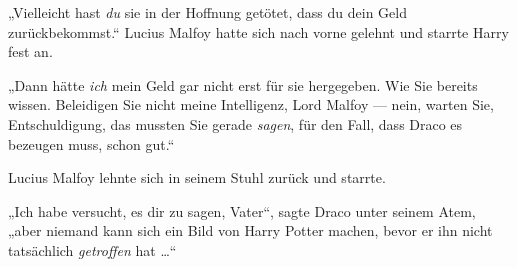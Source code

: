 „Vielleicht hast \emph{du} sie in der Hoffnung getötet, dass du dein Geld zurückbekommst.“ Lucius Malfoy hatte sich nach vorne gelehnt und starrte Harry fest an.

„Dann hätte \emph{ich} mein Geld gar nicht erst für sie hergegeben. Wie Sie bereits wissen. Beleidigen Sie nicht meine Intelligenz, Lord Malfoy — nein, warten Sie, Entschuldigung, das mussten Sie gerade \emph{sagen}, für den Fall, dass Draco es bezeugen muss, schon gut.“

Lucius Malfoy lehnte sich in seinem Stuhl zurück und starrte.

„Ich habe versucht, es dir zu sagen, Vater“, sagte Draco unter seinem Atem, „aber niemand kann sich ein Bild von Harry Potter machen, bevor er ihn nicht tatsächlich \emph{getroffen} hat …“

